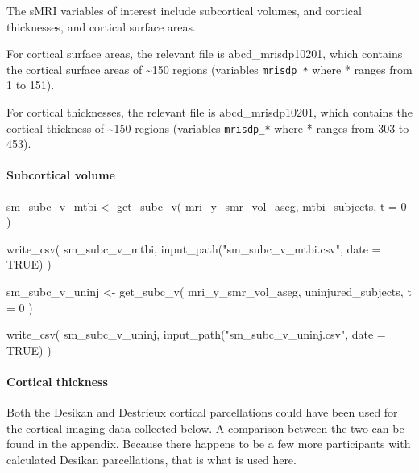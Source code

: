 \documentclass[
  letterpaper,
  DIV=11,
  numbers=noendperiod]{scrreprt}
\let\oldparagraph\paragraph
\renewcommand{\paragraph}[1]{\oldparagraph{#1}\mbox{}}
\newenvironment{Shaded}{\begin{snugshade}}{\end{snugshade}}
\newcommand{\AttributeTok}[1]{\textcolor[rgb]{0.40,0.45,0.13}{#1}}
\newcommand{\ConstantTok}[1]{\textcolor[rgb]{0.56,0.35,0.01}{#1}}
\newcommand{\DecValTok}[1]{\textcolor[rgb]{0.68,0.00,0.00}{#1}}
\newcommand{\FunctionTok}[1]{\textcolor[rgb]{0.28,0.35,0.67}{#1}}
\newcommand{\NormalTok}[1]{\textcolor[rgb]{0.00,0.23,0.31}{#1}}
\newcommand{\OtherTok}[1]{\textcolor[rgb]{0.00,0.23,0.31}{#1}}
\newcommand{\StringTok}[1]{\textcolor[rgb]{0.13,0.47,0.30}{#1}}
\begin{document}
The sMRI variables of interest include subcortical volumes, and cortical
thicknesses, and cortical surface areas.

For cortical surface areas, the relevant file is abcd\_mrisdp10201,
which contains the cortical surface areas of \textasciitilde150 regions
(variables \texttt{mrisdp\_*} where * ranges from 1 to 151).

For cortical thicknesses, the relevant file is abcd\_mrisdp10201, which
contains the cortical thickness of \textasciitilde150 regions (variables
\texttt{mrisdp\_*} where * ranges from 303 to 453).

\paragraph{Subcortical volume}\label{subcortical-volume}

\begin{Shaded}
\begin{Highlighting}[]
\NormalTok{sm\_subc\_v\_mtbi }\OtherTok{\textless{}{-}} \FunctionTok{get\_subc\_v}\NormalTok{(}
\NormalTok{    mri\_y\_smr\_vol\_aseg,}
\NormalTok{    mtbi\_subjects,}
    \AttributeTok{t =} \DecValTok{0}
\NormalTok{)}

\FunctionTok{write\_csv}\NormalTok{(}
\NormalTok{    sm\_subc\_v\_mtbi, }\FunctionTok{input\_path}\NormalTok{(}\StringTok{"sm\_subc\_v\_mtbi.csv"}\NormalTok{, }\AttributeTok{date =} \ConstantTok{TRUE}\NormalTok{)}
\NormalTok{)}

\NormalTok{sm\_subc\_v\_uninj }\OtherTok{\textless{}{-}} \FunctionTok{get\_subc\_v}\NormalTok{(}
\NormalTok{    mri\_y\_smr\_vol\_aseg,}
\NormalTok{    uninjured\_subjects,}
    \AttributeTok{t =} \DecValTok{0}
\NormalTok{)}

\FunctionTok{write\_csv}\NormalTok{(}
\NormalTok{    sm\_subc\_v\_uninj, }\FunctionTok{input\_path}\NormalTok{(}\StringTok{"sm\_subc\_v\_uninj.csv"}\NormalTok{, }\AttributeTok{date =} \ConstantTok{TRUE}\NormalTok{)}
\NormalTok{)}
\end{Highlighting}
\end{Shaded}

\paragraph{Cortical thickness}\label{cortical-thickness}

Both the Desikan and Destrieux cortical parcellations could have been
used for the cortical imaging data collected below. A comparison between
the two can be found in the appendix. Because there happens to be a few
more participants with calculated Desikan parcellations, that is what is
used here.
\end{document}
